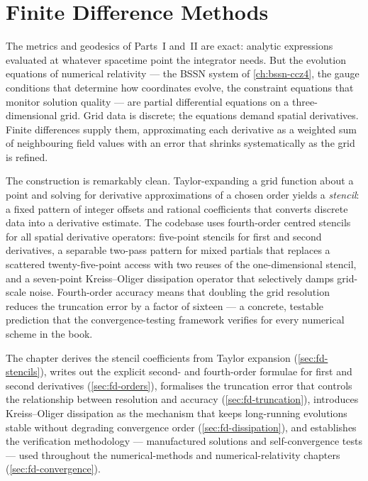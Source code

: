 \chapter{Finite Difference Methods}
\label{ch:finite-differences}

The metrics and geodesics of Parts~I and~II are exact: analytic expressions
evaluated at whatever spacetime point the integrator needs.  But the evolution
equations of numerical relativity --- the BSSN system of
\cref{ch:bssn-ccz4}, the gauge conditions that determine how coordinates
evolve, the constraint equations that monitor solution quality --- are partial
differential equations on a three-dimensional grid.  Grid data is discrete;
the equations demand spatial derivatives.  Finite differences supply them,
approximating each derivative as a weighted sum of neighbouring field values
with an error that shrinks systematically as the grid is refined.

The construction is remarkably clean.  Taylor-expanding a grid function about
a point and solving for derivative approximations of a chosen order yields a
\emph{stencil}: a fixed pattern of integer offsets and rational coefficients
that converts discrete data into a derivative estimate.  The codebase uses
fourth-order centred stencils for all spatial derivative operators: five-point
stencils for first and second derivatives, a separable two-pass pattern for
mixed partials that replaces a scattered twenty-five-point access with two
reuses of the one-dimensional stencil, and a
seven-point Kreiss--Oliger dissipation operator that selectively damps
grid-scale noise.  Fourth-order accuracy means that doubling the grid
resolution reduces the truncation error by a factor of sixteen --- a concrete,
testable prediction that the convergence-testing framework verifies for every
numerical scheme in the book.

The chapter derives the stencil coefficients from Taylor expansion
(\cref{sec:fd-stencils}), writes out the explicit second- and fourth-order
formulae for first and second derivatives (\cref{sec:fd-orders}), formalises
the truncation error that controls the relationship between resolution and
accuracy (\cref{sec:fd-truncation}), introduces Kreiss--Oliger dissipation as
the mechanism that keeps long-running evolutions stable without degrading
convergence order (\cref{sec:fd-dissipation}), and establishes the
verification methodology --- manufactured solutions and self-convergence
tests --- used throughout the numerical-methods and numerical-relativity
chapters (\cref{sec:fd-convergence}).

